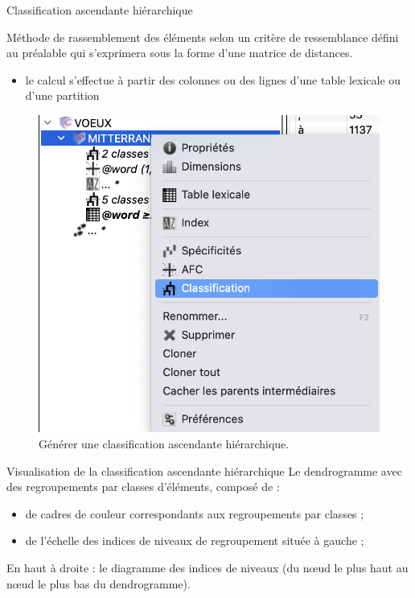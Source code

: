 \documentclass[xetex,xcolor={table,usenames,dvipsnames}]{beamer}
\begin{document}
\begin{frame}{Classification ascendante hiérarchique \citep{benzecri1979}}
		\begin{block}{\vspace{-6mm}}
		\justifying 
Méthode de rassemblement des éléments selon un critère de ressemblance défini au préalable qui s’exprimera sous la forme d’une matrice de distances.
		\end{block}
		\begin{itemize}
	\item le calcul s'effectue à partir des colonnes ou des lignes d'une table lexicale ou d’une partition	
\end{itemize}
			\begin{figure}[h] %
		\centering
		\includegraphics[width=.3\linewidth]{img/classif.png}
		\caption{Générer une classification ascendante hiérarchique.}
		\label{fig:ling_out_TAL}
	\end{figure}
\end{frame}

\begin{frame}{Visualisation de la classification ascendante hiérarchique}
Le dendrogramme avec des regroupements par classes d’éléments, composé de :
	\begin{itemize}
		\item de cadres de couleur correspondants aux regroupements par classes ;
		\item de l’échelle des indices de niveaux de regroupement située à gauche ;
	\end{itemize}
En haut à droite : le diagramme des indices de niveaux (du nœud le plus haut au nœud le plus bas du dendrogramme).


\end{frame}
\end{document}
